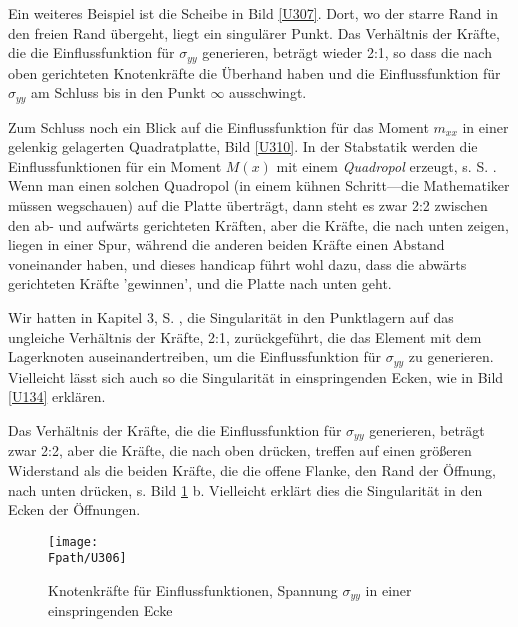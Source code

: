 {{{{{{{{{Ein weiteres Beispiel ist die Scheibe in Bild \ref{U307}. Dort, wo der starre Rand in den freien Rand \"{u}bergeht, liegt ein singul\"{a}rer Punkt. Das Verh\"{a}ltnis der Kr\"{a}fte, die die Einflussfunktion f\"{u}r $\sigma_{yy}$ generieren, betr\"{a}gt wieder 2:1, so dass die nach oben gerichteten Knotenkr\"{a}fte die \"{U}berhand haben und die Einflussfunktion f\"{u}r $\sigma_{yy}$ am Schluss bis in den Punkt $\infty$ ausschwingt.

Zum Schluss noch ein Blick auf die Einflussfunktion f\"{u}r das Moment $m_{xx}$ in einer gelenkig gelagerten Quadratplatte, Bild \ref{U310}. In der Stabstatik werden die Einflussfunktionen f\"{u}r ein Moment $M(x)$ mit einem {\em Quadropol\/} erzeugt, s. S. \pageref{U303}. Wenn man einen solchen Quadropol (in einem k\"{u}hnen Schritt---die Mathematiker m\"{u}ssen wegschauen) auf die Platte \"{u}bertr\"{a}gt, dann steht es zwar 2:2 zwischen den ab- und aufw\"{a}rts gerichteten Kr\"{a}ften, aber die Kr\"{a}fte, die nach unten zeigen, liegen in einer Spur, w\"{a}hrend die anderen beiden Kr\"{a}fte einen Abstand voneinander haben, und dieses handicap f\"{u}hrt wohl dazu, dass die abw\"{a}rts gerichteten Kr\"{a}fte 'gewinnen', und die Platte nach unten geht.

Wir hatten in Kapitel 3, S. \pageref{Punktlager}, die Singularit\"{a}t in den Punktlagern auf das ungleiche Verh\"{a}ltnis der Kr\"{a}fte, 2:1, zur\"{u}ckgef\"{u}hrt, die das Element mit dem Lagerknoten auseinandertreiben, um die Einflussfunktion f\"{u}r $\sigma_{yy}$ zu generieren. Vielleicht l\"{a}sst sich auch so  die Singularit\"{a}t in einspringenden Ecken, wie in Bild \ref{U134} erkl\"{a}ren.

Das Verh\"{a}ltnis der Kr\"{a}fte, die die Einflussfunktion f\"{u}r $\sigma_{yy}$ generieren, betr\"{a}gt zwar 2:2, aber die Kr\"{a}fte, die nach oben dr\"{u}cken, treffen auf einen gr\"{o}{\ss}eren Widerstand als die beiden Kr\"{a}fte, die die offene Flanke, den Rand der \"{O}ffnung, nach unten dr\"{u}cken, s. Bild \ref{U306} b. Vielleicht erkl\"{a}rt dies die Singularit\"{a}t in den Ecken der \"{O}ffnungen.


\begin{figure}
\centering
\texttt{[image: \\Fpath/U306]}
\caption{Knotenkr\"{a}fte f\"{u}r Einflussfunktionen, Spannung $\sigma_{yy} $ in einer einspringenden Ecke}
\label{U306}%
\end{figure}%


}}}}}}}}}
